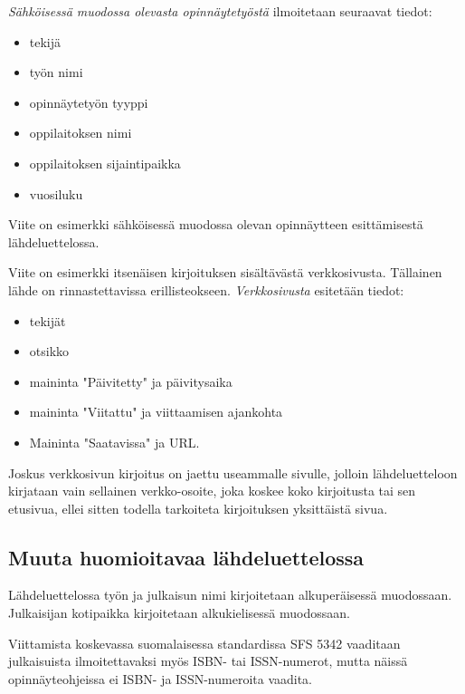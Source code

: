 \textit{Sähköisessä muodossa olevasta opinnäytetyöstä} ilmoitetaan
seuraavat tiedot:
 
\begin{itemize}
\item[--]tekijä
\item[--]työn nimi
\item[--]opinnäytetyön tyyppi
\item[--]oppilaitoksen nimi
\item[--]oppilaitoksen sijaintipaikka
\item[--]vuosiluku

\end{itemize}

Viite \citep{Adida} on esimerkki sähköisessä muodossa olevan
opinnäytteen esittämisestä lähdeluettelossa.

Viite \citep{viittaaminen} on esimerkki itsenäisen kirjoituksen sisältävästä
verkkosivusta. Tällainen lähde on rinnastettavissa erillisteokseen.
\textit{Verkkosivusta} esitetään tiedot:

\begin{itemize}
\item[--] tekijät
\item[--] otsikko
\item[--] maininta "Päivitetty" ja päivitysaika 
\item[--] maininta "Viitattu" ja viittaamisen ajankohta
\item[--] Maininta "Saatavissa" ja URL.
\end{itemize}

Joskus verkkosivun kirjoitus on jaettu useammalle sivulle, jolloin
lähdeluetteloon kirjataan vain sellainen verkko-osoite, joka koskee
koko kirjoitusta tai sen etusivua, ellei sitten 
todella tarkoiteta kirjoituksen yksittäistä sivua. 

\subsection{Muuta huomioitavaa lähdeluettelossa}

Lähdeluettelossa työn ja julkaisun nimi kirjoitetaan alkuperäisessä
muodossaan. Julkaisijan kotipaikka kirjoitetaan alkukielisessä
muodossaan.

Viittamista koskevassa suomalaisessa standardissa
SFS 5342 \citep{sfs} vaaditaan julkaisuista ilmoitettavaksi myös ISBN- tai
ISSN-numerot, mutta näissä opinnäyteohjeissa ei ISBN- ja 
ISSN-numeroita vaadita. 